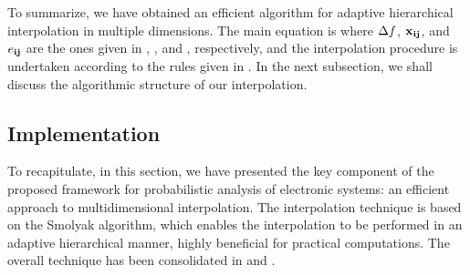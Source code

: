To summarize, we have obtained an efficient algorithm for adaptive hierarchical
interpolation in multiple dimensions. The main equation is 
where $\Delta f$, $\mathbf{x}_{\mathbf{i}\mathbf{j}}$, and $e_{\mathbf{i}\mathbf{j}}$ are the ones given in
, , and , respectively, and the
interpolation procedure is undertaken according to the rules given in
. In the next subsection, we shall discuss the algorithmic
structure of our interpolation.



\subsection{Implementation} 


To recapitulate, in this section, we have presented the key component of the
proposed framework for probabilistic analysis of electronic systems: an
efficient approach to multidimensional interpolation. The interpolation
technique is based on the Smolyak algorithm, which enables the interpolation to
be performed in an adaptive hierarchical manner, highly beneficial for practical
computations. The overall technique has been consolidated in 
and .
